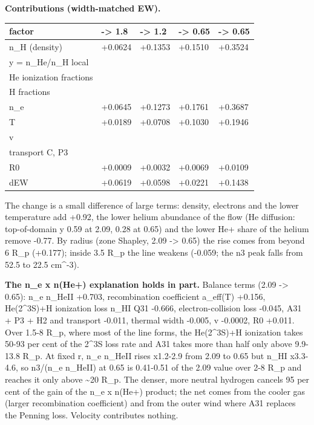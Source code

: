 \documentclass[english,a4paper]{my_memo}
\begin{document}
\textbf{Contributions (width-matched EW).}

{\def\LTcaptype{none} %
{\small
\begin{longtable}[]{@{}>{\raggedright\arraybackslash}p{\dimexpr(\linewidth-10\tabcolsep)/5\relax}>{\raggedright\arraybackslash}p{\dimexpr(\linewidth-10\tabcolsep)/5\relax}>{\raggedright\arraybackslash}p{\dimexpr(\linewidth-10\tabcolsep)/5\relax}>{\raggedright\arraybackslash}p{\dimexpr(\linewidth-10\tabcolsep)/5\relax}>{\raggedright\arraybackslash}p{\dimexpr(\linewidth-10\tabcolsep)/5\relax}@{}}
\toprule\noalign{}
factor & 2.09 -\textgreater{} 1.8 & 1.8 -\textgreater{} 1.2 & 1.2 -\textgreater{} 0.65 & 2.09 -\textgreater{} 0.65 \\
\midrule\noalign{}
\endhead
\bottomrule\noalign{}
\endlastfoot
n\_H (density) & +0.0624 & +0.1353 & +0.1510 & +0.3524 \\
y = n\_He/n\_H local & -0.0566 & -0.2223 & -0.3428 & -0.6261 \\
He ionization fractions & -0.0257 & -0.0489 & -0.0652 & -0.1406 \\
H fractions & -0.0005 & -0.0016 & -0.0025 & -0.0046 \\
n\_e & +0.0645 & +0.1273 & +0.1761 & +0.3687 \\
T & +0.0189 & +0.0708 & +0.1030 & +0.1946 \\
v & -0.0000 & -0.0001 & -0.0001 & -0.0002 \\
transport C, P3 & -0.0019 & -0.0040 & -0.0043 & -0.0112 \\
R0 & +0.0009 & +0.0032 & +0.0069 & +0.0109 \\
dEW & +0.0619 & +0.0598 & +0.0221 & +0.1438 \\
\end{longtable}
}
}

The change is a small difference of large terms: density, electrons and
the lower temperature add +0.92, the lower helium abundance of the flow
(He diffusion: top-of-domain y 0.59 at 2.09, 0.28 at 0.65) and the lower
He+ share of the helium remove -0.77. By radius (zone Shapley,
2.09 -\textgreater{} 0.65) the rise comes from beyond 6 R\_p (+0.177); inside 3.5 R\_p the
line weakens (-0.059; the n3 peak falls from 52.5 to 22.5 cm\^{}-3).

\textbf{The n\_e x n(He+) explanation holds in part.} Balance terms
(2.09 -\textgreater{} 0.65): n\_e n\_HeII +0.703, recombination coefficient a\_eff(T)
+0.156, He(2\^{}3S)+H ionization loss n\_HI Q31 -0.666, electron-collision
loss -0.045, A31 + P3 + H2 and transport -0.011, thermal width -0.005, v
-0.0002, R0 +0.011. Over 1.5-8 R\_p, where most of the line forms, the
He(2\^{}3S)+H ionization takes 50-93 per cent of the 2\^{}3S loss rate and A31
takes more than half only above 9.9-13.8 R\_p. At fixed r, n\_e n\_HeII rises
x1.2-2.9 from 2.09 to 0.65 but n\_HI x3.3-4.6, so n3/(n\_e n\_HeII) at 0.65
is 0.41-0.51 of the 2.09 value over 2-8 R\_p and reaches it only above
\textasciitilde20 R\_p. The denser, more neutral hydrogen cancels 95 per cent of the gain
of the n\_e x n(He+) product; the net comes from the cooler gas (larger
recombination coefficient) and from the outer wind where A31 replaces the
Penning loss. Velocity contributes nothing.
\end{document}
